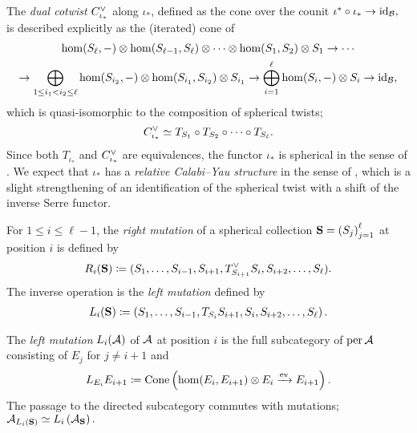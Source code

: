 \documentclass[a4paper,12pt]{amsart}
\begin{document}
The \emph{dual cotwist} $C^\vee_{\iota_*}$ along $\iota_*$,
defined as the cone over the counit
$
\iota^* \circ \iota_* \to \operatorname{id}_{\mathcal{B}},
$
is described explicitly as the (iterated) cone of
\begin{multline}
\hom(S_\ell, -)
\otimes \hom(S_{\ell-1}, S_\ell)
\otimes \cdots
\otimes \hom(S_1, S_2)
\otimes S_1
\to
\cdots\\
\to
\bigoplus_{1 \le i_1 < i_2 \le \ell}
\hom(S_{i_2}, -) \otimes \hom(S_{i_1}, S_{i_2}) \otimes S_{i_1}
\to
\bigoplus_{i=1}^\ell
\hom(S_i, -) \otimes S_i
\to
\operatorname{id}_{\mathcal{B}},
\end{multline}
which is quasi-isomorphic to the composition
of spherical twists;
\begin{align}
C^\vee_{\iota_*} \simeq
T_{S_1} \circ T_{S_2} \circ \cdots \circ T_{S_\ell}.
\end{align}
Since both $T_{\iota_*}$ and $C^\vee_{\iota_*}$ are equivalences,
the functor $\iota_*$ is spherical
in the sense of \cite[Theorem 1.1]{MR3692883}.
We expect that
$\iota_*$ has
a \emph{relative Calabi--Yau structure}
in the sense of \cite{MR3911626},
which is a slight strengthening
of an identification
of the spherical twist
with a shift of the inverse Serre functor.

For $1 \le i \le \ell-1$,
the
\emph{right mutation}
of a spherical collection
$
 \mathbf{S} = \left( S_j \right)_{j=1}^\ell
$
at position $i$
is defined by
\begin{align}
 R_i (\mathbf{S}) \coloneqq
  ( S_1, \ldots, S_{i-1}, S_{i+1}, T_{S_{i+1}}^\vee S_i, S_{i+2}, \ldots, S_\ell ).
\end{align}
The inverse operation is
the \emph{left mutation}
defined by
\begin{align}
 L_i (\mathbf{S}) \coloneqq
  \left( S_1, \ldots, S_{i-1}, T_{S_i} S_{i+1}, S_i, S_{i+2}, \ldots, S_\ell \right).
\end{align}

The \emph{left mutation} $L_i(\mathcal{A})$ of $\mathcal{A}$
at position $i$
is the full subcategory of $\operatorname{per} \mathcal{A}$
consisting of $E_j$ for $j \ne i+1$
and
\begin{align}
 L_{E_i} E_{i+1} \coloneqq \operatorname{Cone} \left( \hom(E_i, E_{i+1}) \otimes E_i \xrightarrow{\operatorname{ev}} E_{i+1} \right).
\end{align}
%
The passage to the directed subcategory commutes with mutations;
$
\mathcal{A}_{L_i(\mathbf{S})} \simeq L_i \left( \mathcal{A}_{\mathbf{S}} \right).
$
\end{document}
